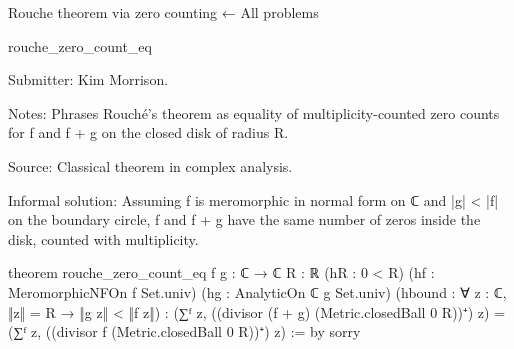 Rouche theorem via zero counting
← All problems

rouche_zero_count_eq

Submitter: Kim Morrison.

Notes: Phrases Rouché's theorem as equality of multiplicity-counted zero counts for f and f + g on the closed disk of radius R.

Source: Classical theorem in complex analysis.

Informal solution: Assuming f is meromorphic in normal form on ℂ and |g| < |f| on the boundary circle, f and f + g have the same number of zeros inside the disk, counted with multiplicity.

theorem rouche_zero_count_eq {f g : ℂ → ℂ} {R : ℝ}
    (hR : 0 < R)
    (hf : MeromorphicNFOn f Set.univ)
    (hg : AnalyticOn ℂ g Set.univ)
    (hbound : ∀ z : ℂ, ‖z‖ = R → ‖g z‖ < ‖f z‖) :
    (∑ᶠ z, ((divisor (f + g) (Metric.closedBall 0 R))⁺) z) =
      (∑ᶠ z, ((divisor f (Metric.closedBall 0 R))⁺) z) := by
  sorry